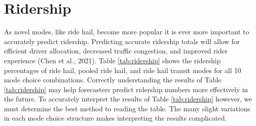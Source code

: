 \documentclass[fancy, masters]{byuthesis}
\begin{document}
\hypertarget{res-ridership}{%
\section{Ridership}\label{res-ridership}}

As novel modes, like ride hail, become more popular it is ever more important to accurately predict ridership. Predicting accurate ridership totals will allow for efficient driver allocation, decreased traffic congestion, and improved rider experience (Chen et al., 2021). Table \ref{tab:ridership} shows the ridership percentages of ride hail, pooled ride hail, and ride hail transit modes for all 10 mode choice combinations. Correctly understanding the results of Table \ref{tab:ridership} may help forecasters predict ridership numbers more effectively in the future. To accurately interpret the results of Table \ref{tab:ridership} however, we must determine the best method to reading the table. The many slight variations in each mode choice structure makes interpreting the results complicated.

\begin{table}

\caption{\label{tab:ridership}Percent Ride Hail Ridership by Mode Choice Combination Scenario.}
\centering
{}
\end{table}
\end{document}
